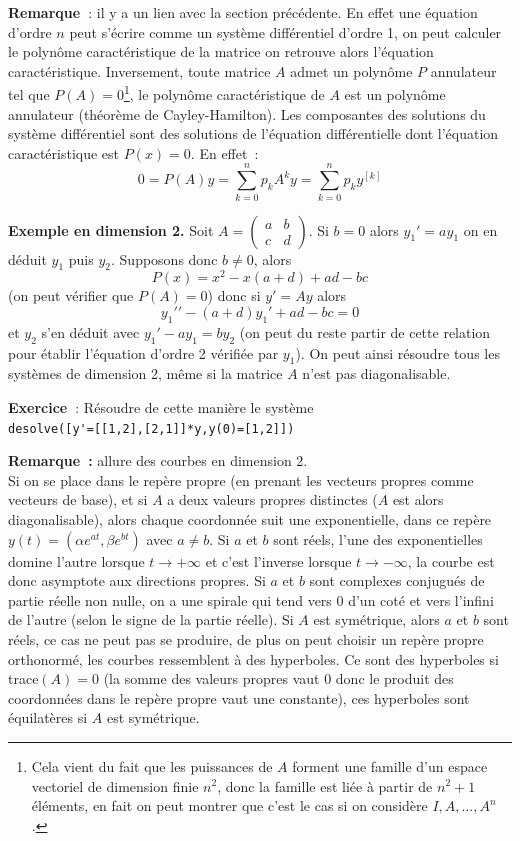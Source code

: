 \documentclass[a4paper,11pt]{article}
\begin{document}
\begin{giacjshere}
{\bf Remarque~}: il y a un lien avec la section
pr\'ec\'edente. En effet une \'equation d'ordre $n$ peut
s'\'ecrire comme un syst\`eme diff\'erentiel d'ordre 1,
on peut calculer le polyn\^ome caract\'eristique de la matrice
on retrouve alors l'\'equation caract\'eristique. Inversement,
toute matrice $A$ admet un polyn\^ome $P$
annulateur tel que $P(A)=0$\footnote{Cela vient du fait que
les puissances de $A$ forment une famille d'un
espace vectoriel de dimension finie $n^2$, donc la famille est li\'ee
\`a partir de $n^2+1$ \'el\'ements, en fait on peut montrer
que c'est le cas si on consid\`ere $I,A,...,A^n$.},
le polyn\^ome caract\'eristique de $A$ est un polyn\^ome annulateur
(th\'eor\`eme de Cayley-Hamilton).
Les composantes des solutions du syst\`eme diff\'erentiel sont des 
solutions de l'\'equation diff\'erentielle dont l'\'equation
caract\'eristique est $P(x)=0$. En effet~:
$$0=P(A)y=\sum_{k=0}^n p_k A^k y = \sum_{k=0}^n p_k y^{[k]}$$

{\bf Exemple en dimension 2.}
Soit $A=\left(\begin{array}{cc}
a & b \\
c & d
\end{array}\right) $. Si $b=0$ alors $y_1'=ay_1$ on en d\'eduit
$y_1$ puis $y_2$. Supposons donc $b\neq 0$, alors
$$ P(x)=x^{2} - x (a+d) +a d-b c$$
(on peut v\'erifier que $P(A)=0$)
donc si $y'=Ay$ alors 
$$ y_1'{'}-(a+d)y_1'+ad-bc=0$$
et $y_2$ s'en d\'eduit avec $y_1'-ay_1=by_2$ (on peut du reste
partir de cette relation pour \'etablir l'\'equation d'ordre 2
v\'erifi\'ee par $y_1$). On peut ainsi
r\'esoudre tous les syst\`emes de dimension 2, m\^eme
si la matrice $A$ n'est pas diagonalisable.

{\bf Exercice~}: R\'esoudre de cette mani\`ere le syst\`eme\\
\verb|desolve([y'=[[1,2],[2,1]]*y,y(0)=[1,2]])|

{\bf Remarque~:} allure des courbes en dimension 2.\\
Si on se place dans le rep\`ere propre (en prenant les vecteurs
propres comme vecteurs de base), et si $A$ a deux valeurs
propres distinctes ($A$ est alors diagonalisable),
alors chaque coordonn\'ee suit une exponentielle, dans ce rep\`ere
$y(t)=(\alpha e^{at}, \beta e^{bt})$ avec $a \neq b$. Si $a$ et $b$
sont r\'eels, l'une des exponentielles domine l'autre lorsque
$t\rightarrow +\infty$ et c'est l'inverse lorsque $t\rightarrow
-\infty$, la courbe est donc asymptote aux directions propres.
Si $a$ et $b$ sont complexes conjugu\'es de partie r\'eelle non nulle, 
on a une spirale qui
tend vers 0 d'un cot\'e et vers l'infini de l'autre (selon le signe
de la partie r\'eelle). Si $A$ est
sym\'etrique, alors $a$ et $b$ sont r\'eels, ce cas ne peut
pas se produire, de plus on peut choisir un rep\`ere propre
orthonorm\'e, les courbes ressemblent \`a des hyperboles.
Ce sont des hyperboles si trace$(A)=0$ (la somme des valeurs
propres vaut 0 donc le produit des coordonn\'ees dans
le rep\`ere propre vaut une constante),
ces hyperboles sont \'equilat\`eres si $A$ est sym\'etrique.


\end{giacjshere}
\end{document}
